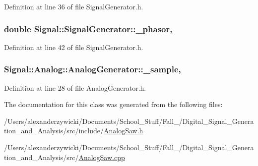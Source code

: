 Definition at line 36 of file Signal\+Generator.\+h.

\hypertarget{classSignal_1_1SignalGenerator_af4aa0728ded00777be26a06d883eaeb3}{
\subsubsection[{\+\_\+phasor}]{\setlength{\rightskip}{0pt plus 5cm}double Signal\+::\+Signal\+Generator\+::\+\_\+phasor\hspace{0.3cm}{\ttfamily [protected]}, {\ttfamily [inherited]}}}\label{classSignal_1_1SignalGenerator_af4aa0728ded00777be26a06d883eaeb3}


Definition at line 42 of file Signal\+Generator.\+h.

\hypertarget{classSignal_1_1Analog_1_1AnalogGenerator_a8750d751c4dbc67084dfc74ab9a6a763}{
\subsubsection[{\+\_\+sample}]{ Signal\+::\+Analog\+::\+Analog\+Generator\+::\+\_\+sample\hspace{0.3cm}{\ttfamily [protected]}, {\ttfamily [inherited]}}}\label{classSignal_1_1Analog_1_1AnalogGenerator_a8750d751c4dbc67084dfc74ab9a6a763}


Definition at line 28 of file Analog\+Generator.\+h.



The documentation for this class was generated from the following files\+:\begin{DoxyCompactItemize}
\item 
/\+Users/alexanderzywicki/\+Documents/\+School\+\_\+\+Stuff/\+Fall\+\_/\+Digital\+\_\+\+Signal\+\_\+\+Generation\+\_\+and\+\_\+\+Analysis/src/include/\hyperlink{AnalogSaw_8h}{Analog\+Saw.\+h}\item 
/\+Users/alexanderzywicki/\+Documents/\+School\+\_\+\+Stuff/\+Fall\+\_/\+Digital\+\_\+\+Signal\+\_\+\+Generation\+\_\+and\+\_\+\+Analysis/src/\hyperlink{AnalogSaw_8cpp}{Analog\+Saw.\+cpp}\end{DoxyCompactItemize}
